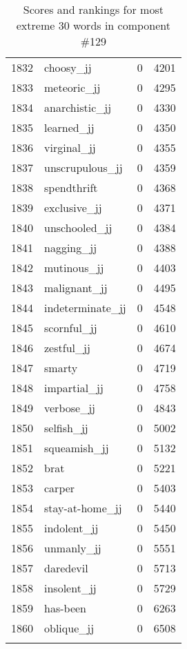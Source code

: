 \begin{longtable}[!htbp]{| rlr@{.}l |}
    1832 & choosy\_jj & 0 & 4201 \\
    1833 & meteoric\_jj & 0 & 4295 \\
    1834 & anarchistic\_jj & 0 & 4330 \\
    1835 & learned\_jj & 0 & 4350 \\
    1836 & virginal\_jj & 0 & 4355 \\
    1837 & unscrupulous\_jj & 0 & 4359 \\
    1838 & spendthrift & 0 & 4368 \\
    1839 & exclusive\_jj & 0 & 4371 \\
    1840 & unschooled\_jj & 0 & 4384 \\
    1841 & nagging\_jj & 0 & 4388 \\
    1842 & mutinous\_jj & 0 & 4403 \\
    1843 & malignant\_jj & 0 & 4495 \\
    1844 & indeterminate\_jj & 0 & 4548 \\
    1845 & scornful\_jj & 0 & 4610 \\
    1846 & zestful\_jj & 0 & 4674 \\
    1847 & smarty & 0 & 4719 \\
    1848 & impartial\_jj & 0 & 4758 \\
    1849 & verbose\_jj & 0 & 4843 \\
    1850 & selfish\_jj & 0 & 5002 \\
    1851 & squeamish\_jj & 0 & 5132 \\
    1852 & brat & 0 & 5221 \\
    1853 & carper & 0 & 5403 \\
    1854 & stay-at-home\_jj & 0 & 5440 \\
    1855 & indolent\_jj & 0 & 5450 \\
    1856 & unmanly\_jj & 0 & 5551 \\
    1857 & daredevil & 0 & 5713 \\
    1858 & insolent\_jj & 0 & 5729 \\
    1859 & has-been & 0 & 6263 \\
    1860 & oblique\_jj & 0 & 6508 \\
    \hline
    \caption{Scores and rankings for most extreme 30 words in component \#129} \\
\end{longtable}
